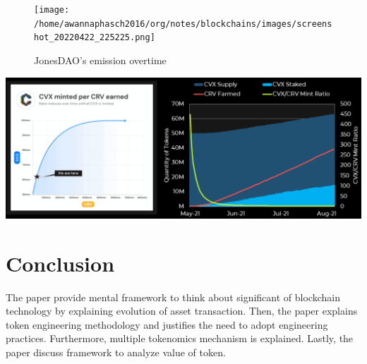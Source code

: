 \documentclass{IEEEtran}
\begin{document}
\begin{figure}[htbp]
\centering
\texttt{[image: /home/awannaphasch2016/org/notes/blockchains/images/screenshot\_20220422\_225225.png]}
\caption{\label{JonesDAO's_emission_rates_overtime}JonesDAO's emission overtime}
\end{figure}
\begin{center}
\includegraphics[width=.9\linewidth]{./images/screenshot_20220504_223846.png}
\label{Convex_emission_rate_overtime}
\end{center}

\section{Conclusion}
\label{sec:orgabc1d4e}
The paper provide mental framework to think about significant of blockchain technology by explaining evolution of asset transaction. Then, the paper explains token engineering methodology and justifies the need to adopt engineering practices. Furthermore, multiple tokenomics mechanism is explained. Lastly, the paper discuss framework to analyze value of token.

\printbibliography
\end{document}
